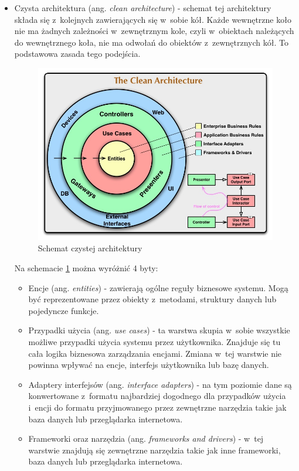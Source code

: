 \documentclass[printmode]{mgr}
\begin{document}
\begin{itemize}
  \item Czysta architektura (ang. \textit{clean architecture}) - schemat tej architektury składa się z~kolejnych zawierających się w~sobie kół. Każde wewnętrzne koło nie ma żadnych zależności w~zewnętrznym kole, czyli w~obiektach należących do wewnętrznego koła, nie ma odwołań do obiektów z~zewnętrznych kół. \cite{clean_architecture} To podstawowa zasada tego podejścia. 

  \begin{figure}[H]
    \centering
    \includegraphics[width=1\linewidth]{pictures/clean_architecture}
    \caption{Schemat czystej architektury \cite{clean_architecture}}
    \label{fig:clean_architecture}
  \end{figure}

  Na schemacie \ref{fig:clean_architecture} można wyróżnić 4 byty:

  \begin{itemize}
    \item Encje (ang. \textit{entities}) - zawierają ogólne reguły biznesowe systemu. Mogą być reprezentowane przez obiekty z~metodami, struktury danych lub pojedyncze funkcje.
    \item Przypadki użycia (ang. \textit{use cases}) - ta warstwa skupia w~sobie wszystkie możliwe przypadki użycia systemu przez użytkownika. Znajduje się tu cała logika biznesowa zarządzania encjami. Zmiana w~tej warstwie nie powinna wpływać na encje, interfejs użytkownika lub bazę danych.
    \item Adaptery interfejsów (ang. \textit{interface adapters}) - na tym poziomie dane są konwertowane z~formatu najbardziej dogodnego dla przypadków użycia i~encji do formatu przyjmowanego przez zewnętrzne narzędzia takie jak baza danych lub przeglądarka internetowa. 
    \item Frameworki oraz narzędzia (ang. \textit{frameworks and drivers}) - w~tej warstwie znajdują się zewnętrzne narzędzia takie jak inne frameworki, baza danych lub przeglądarka internetowa.
  \end{itemize}


\end{itemize}
\end{document}
